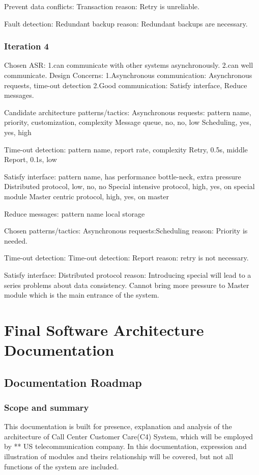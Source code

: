 \documentclass{article}
\begin{document}
		Prevent data conflicts: Transaction
		reason: Retry is unreliable.

		Fault detection: Redundant backup
		reason: Redundant backups are necessary.

		\subsubsection{Iteration 4}
		Chosen ASR: 
		1.can communicate with other systems asynchronously.
		2.can well communicate.
		Design Concerns:
		1.Asynchronous communication: Asynchronous requests, time-out detection
		2.Good communication: Satisfy interface, Reduce messages.

		Candidate architecture patterns/tactics:
		Asynchronous requests:
			pattern name, priority, customization, complexity
			Message queue, no, no, low
			Scheduling, yes, yes, high
		
		Time-out detection:
			pattern name, report rate, complexity
			Retry, 0.5s, middle
			Report, 0.1s, low
		
		Satisfy interface:
			pattern name, has performance bottle-neck, extra pressure
			Distributed protocol, low, no, no
			Special intensive protocol, high, yes, on special module
			Master centric protocol, high, yes, on master
		
		Reduce messages:
			pattern name
			local storage
		
		Chosen patterns/tactics:
		Asynchronous requests:Scheduling
		reason: Priority is needed.

		Time-out detection:
		Time-out detection: Report
		reason: retry is not necessary.

		Satisfy interface: Distributed protocol
		reason: Introducing special will lead to a series problems about data consistency. Cannot bring more pressure to Master module which is the main entrance of the system.


		
		

	\section{Final Software Architecture Documentation}
	\subsection{Documentation Roadmap}
	\subsubsection{Scope and summary}
	This documentation is built for presence, explanation and analysis of the architecture of Call Center Customer Care(C4) System, which will be employed by ** US telecommunication company. In this documentation, expression and illustration of modules and theirs relationship will be covered, but not all functions of the system are included.
\end{document}
